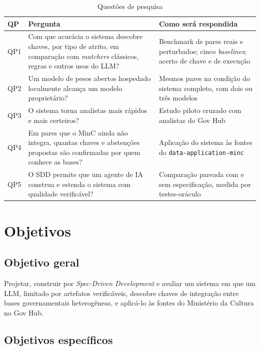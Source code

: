 \begin{table}[htbp]
\centering
\caption{Questões de pesquisa}
\label{tab:qps}
\footnotesize
\begin{tabularx}{\textwidth}{@{}l>{\raggedright\arraybackslash}X>{\raggedright\arraybackslash}p{}@{}}
\toprule
\textbf{QP} & \textbf{Pergunta} & \textbf{Como será respondida} \\
\midrule
QP1 & Com que acurácia o sistema descobre chaves, por tipo de atrito, em comparação com \emph{matchers} clássicos, regras e outros usos do LLM? & Benchmark de pares reais e perturbados; cinco \emph{baselines}; acerto de chave e de execução \\
QP2 & Um modelo de pesos abertos hospedado localmente alcança um modelo proprietário? & Mesmos pares na condição do sistema completo, com dois ou três modelos \\
QP3 & O sistema torna analistas mais rápidos e mais certeiros? & Estudo piloto cruzado com analistas do Gov Hub \\
QP4 & Em pares que o MinC ainda não integra, quantas chaves e abstenções propostas são confirmadas por quem conhece as bases? & Aplicação do sistema às fontes do \texttt{data-application-minc} \\
QP5 & O SDD permite que um agente de IA construa e estenda o sistema com qualidade verificável? & Comparação pareada com e sem especificação, medida por testes-oráculo \\
\bottomrule
\end{tabularx}
\end{table}

\section{Objetivos}
\label{sec:introducao-objetivos}

\subsection{Objetivo geral}
\label{subsec:introducao-objetivo-geral}

Projetar, construir por \emph{Spec-Driven Development} e avaliar um sistema em
que um LLM, limitado por artefatos verificáveis, descobre chaves de
integração entre bases governamentais heterogêneas, e aplicá-lo às fontes do
Ministério da Cultura no Gov Hub.

\subsection{Objetivos específicos}
\label{subsec:introducao-objetivos-especificos}

